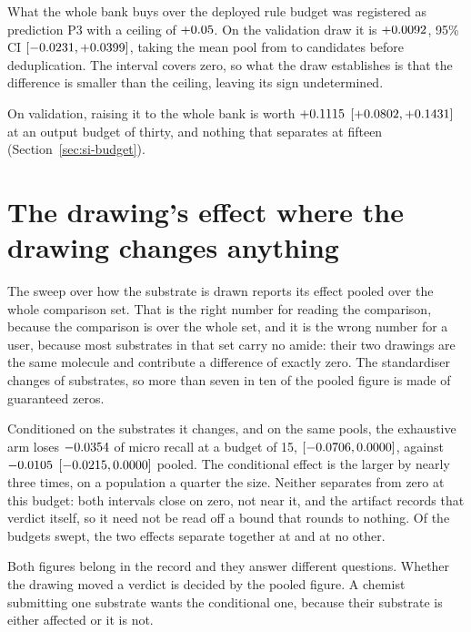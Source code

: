 \documentclass[journal=jcisd8,manuscript=suppinfo,layout=onecolumn]{achemso}
\begin{document}
What the whole bank buys over the deployed rule budget was registered as prediction P3 with a
ceiling of $+0.05$. On the validation draw it is $+0.0092$, 95\%
CI $[-0.0231, +0.0399]$, taking the mean pool from \numHOneZeroPoolBank{} to
\numHOneZeroPoolTrained{} candidates before deduplication. The interval covers zero, so what the
draw establishes is that the difference is smaller than the ceiling, leaving its sign undetermined.


On validation, raising it to the whole bank is worth
$+0.1115$
$[+0.0802, +0.1431]$ at an output
budget of thirty, and nothing that separates at fifteen (Section~\ref{sec:si-budget}).
\section{The drawing's effect where the drawing changes anything}
\label{sec:si-dialcond}

The sweep over how the substrate is drawn reports its effect pooled over the whole comparison set.
That is the right number for reading the comparison, because the comparison is over the whole set,
and it is the wrong number for a user, because most substrates in that set carry no amide: their
two drawings are the same molecule and contribute a difference of exactly zero. The standardiser
changes \numDialcondChanged{} of \numDialcondSubstrates{} substrates, so more than seven in ten of
the pooled figure is made of guaranteed zeros.

Conditioned on the substrates it changes, and on the same pools, the exhaustive arm loses
$-0.0354$ of micro recall at a budget of 15,
$[-0.0706, 0.0000]$, against $-0.0105$
$[-0.0215, 0.0000]$ pooled. The conditional effect is the larger by
nearly three times, on a population a quarter the size. Neither separates from zero at this budget:
both intervals close on zero, not near it, and the artifact records that verdict itself, so it
need not be read off a bound that rounds to nothing. Of the \numDialcondNbudgetsWord{} budgets
swept, the two
effects separate together at \numDialcondBothsepat{} and at no other.

Both figures belong in the record and they answer different questions. Whether the drawing moved a
verdict is decided by the pooled figure. A chemist submitting one substrate wants the
conditional one, because their substrate is either affected or it is not.
\end{document}
